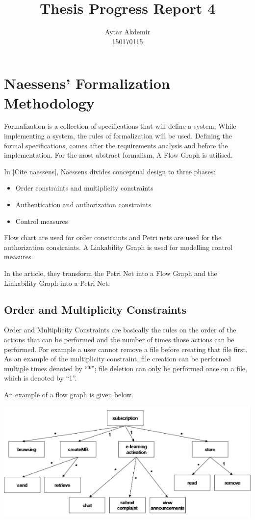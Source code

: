 \documentclass[11pt]{article} %
\title{Thesis Progress Report 4}
\author{Aytar Akdemir \\ 150170115}
\begin{document}
\maketitle

\section{Naessens' Formalization Methodology}

Formalization is a collection of specifications that will define a system.
While implementing a system, the rules of formalization will be used.
Defining the formal specifications, comes after the requirements analysis and before the implementation. 
For the most abstract formalism, A Flow Graph is utilised.



In [Cite naessens], Naessens divides conceptual design to three phases:

\begin{itemize}
\item Order constraints and multiplicity constraints
\item Authentication and authorization constraints
\item Control measures
\end{itemize}

Flow chart are used for order constraints and Petri nets are used for the authorization constraints. 
A Linkability Graph is used for modelling control measures.

In the article, they transform the Petri Net into a Flow Graph and the Linkability Graph into a Petri Net.


\subsection{Order and Multiplicity Constraints}

Order and Multiplicity Constraints are basically the rules on the order of the actions that can be performed and the number of times those actions can be performed. 
For example a user cannot remove a file before creating that file first. 
As an example of the multiplicity constraint, file creation can be performed multiple times denoted by ``*''; file deletion can only be performed once on a file, which is denoted by ``1''. 

An example of a flow graph is given below.

\includegraphics[width=\textwidth]{flow}
\end{document}
